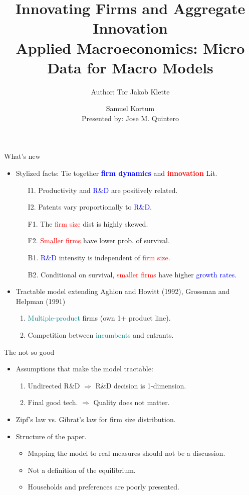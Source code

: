 \documentclass[usenames,dvipsnames,aspectratio=169]{beamer}
\title{Innovating Firms and Aggregate Innovation  \\ \small{Applied Macroeconomics: Micro Data for Macro Models} }
\author{Author: Tor Jakob Klette \and Samuel Kortum \\ 
Presented by: Jose M. Quintero}
\begin{document}
\begin{frame}
  \titlepage
\end{frame}

\begin{frame}{What's new}
\begin{itemize}
    \item Stylized facts: Tie together \textcolor{blue}{\textbf{firm dynamics}} and \textcolor{red}{\textbf{innovation}} Lit. 
    \begin{enumerate}
        \item[I1.] Productivity and \textcolor{blue}{R\&D} are positively related.  
        \item[I2.] Patents vary proportionally to \textcolor{blue}{R\&D}. 
        \item[F1.] The \textcolor{red}{firm size} dist is highly skewed.
        \item[F2.] \textcolor{red}{Smaller firms} have lower prob. of survival.
        \item[B1.] \textcolor{blue}{R\&D} intensity is independent of \textcolor{red}{firm size}. 
        \item[B2.] Conditional on survival, \textcolor{red}{smaller firms} have higher \textcolor{blue}{growth rates}. 
    \end{enumerate}
    \vfill
    \item Tractable model extending Aghion and Howitt (1992), Grossman and Helpman (1991)
    \begin{enumerate}
        \item \textcolor{teal}{Multiple-product} firms (own 1+ product line).
        \item Competition between \textcolor{teal}{incumbents} and entrants. 
    \end{enumerate}
\end{itemize}
\end{frame}

\begin{frame}{The not so good}
     \begin{itemize}
         \item Assumptions that make the model tractable:
         \begin{enumerate}
             \item Undirected R\&D $\Longrightarrow$ R\&D decision is 1-dimension.  
             \item Final good tech. $\Longrightarrow$ Quality does not matter. 
         \end{enumerate}
         \item Zipf's law vs. Gibrat's law for firm size distribution. 
         \item Structure of the paper. 
         \begin{itemize}
             \item Mapping the model to real measures should not be a discussion. 
             \item Not a definition of the equilibrium.
             \item Households and preferences are poorly presented. 
         \end{itemize}
     \end{itemize}
\end{frame}
\end{document}
